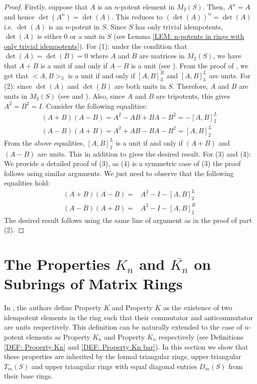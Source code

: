\documentclass[12pt]{amsart}
\theoremstyle{definition}
\numberwithin{equation}{section}
\begin{document}
\begin{proof}
   Firstly, suppose that $A$ is an $n$-potent element in $M_2(S)$. Then, $A^n=A$ and hence $\det(A^n)=\det(A)$. This reduces to $(\det(A))^n=\det(A)$ i.e. $\det(A)$ is an $n$-potent in $S$. Since $S$ has only trivial idempotents, $\det(A)$ is either $0$ or a unit in $S$ (see Lemma \ref{LEM: n-potents in rings with only trivial idempotents}). \newline For (1): under the condition that $\det(A)=\det(B)=0$ where $A$ and $B$ are matrices in $M_2(S)$, we have that $A+B$ is a unit if and only if $A-B$ is a unit (see \cite[Corollary~4.9]{khurana2018idempotents}). From the proof of , we get that $<A,B>_3$ is a unit if and only if $[A,B]_3^R$ and $[A,B]_3^L$ are units. \newline For (2): since $\det(A)$ and $\det(B)$ are both units in $S$. Therefore, $A$ and $B$ are units in $M_2(S)$ (see \cite[Theorem]{grinshpon2008invertibility} and \cite{khurana2009short} ). Also, since $A$ and $B$ are tripotents, this gives $A^2=B^2=I$. Consider the following equalities: 
   \begin{align*}
     (A+B)(A-B)=A^2-AB+BA-B^2=-[A,B]^L_2 \\
     (A-B)(A+B)=A^2+AB-BA-B^2=[A,B]^L_2
   \end{align*}From the above equalities, $[A,B]_2^L$ is a unit if and only if $(A+B)$ and $(A-B)$ are units. This in addition to  gives the desired result.  
   \newline For (3) and (4): We provide a detailed proof of (3), as (4) is a symmetric case of (3) the proof follows using similar arguments. We just need to observe that the following equalities hold:
   \begin{align*}
      (A+B)(A-B)=&A^2-I-[A,B]_2^L\\
      (A-B)(A+B)=& A^2-I-[A,B]_2^R
   \end{align*}
 The desired result follows using the same line of argument as in the proof of part (2).
   \end{proof}
\section{The Properties\texorpdfstring{ $K_n$ and $\overline{K_n}$}{Kn and Kn-bar} on Subrings of Matrix Rings}\label{Section S3}
 In \cite{khurana2018idempotents}, the authors define Property $K$ and Property $\overline{K}$ as the existence of two idempotent elements in the ring such that their commutator and anticommutator are units respectively. This definition can be naturally extended to the case of $n$-potent elements as Property $K_n$ and Property $\overline{K_n}$ respectively (see Definitions \ref{DEF: Property Kn} and \ref{DEF: Property Kn bar}). In this section we show that these properties are inherited by the formal triangular rings, upper triangular $T_m(S)$ and upper triangular rings with equal diagonal entries $D_m(S)$ from their base rings.
\end{document}
